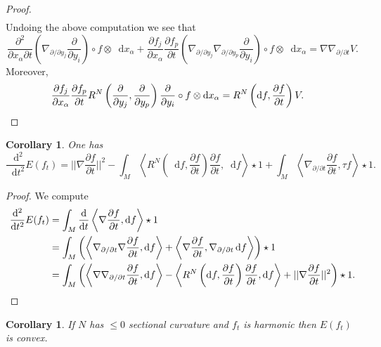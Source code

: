 \documentclass[reqno,12pt,letterpaper]{amsart}
\newcommand*\dif{\mathop{}\!\mathrm{d}}
\newcommand{\parl}{\left(}
\newcommand{\parr}{\right)}
\newcommand{\bral}{\left\langle}
\newcommand{\brar}{\right\rangle}
\newtheorem{corollary}[theorem]{Corollary}
\theoremstyle{definition}
\numberwithin{equation}{section}
\begin{document}
\begin{proof}
\begin{align*}
\end{align*}
Undoing the above computation we see that 
$$\frac{\partial^2}{\partial x_\alpha \partial t} \parl \nabla_{\partial/\partial y_j} \frac{\partial}{\partial y_i} \parr \circ f \otimes \dif x_\alpha + \frac{\partial f_j}{\partial x_\alpha} \frac{\partial f_p}{\partial t} \parl \nabla_{\partial/\partial y_j} \nabla_{\partial/\partial y_p} \frac{\partial}{\partial y_i} \parr \circ f \otimes \dif x_\alpha = \nabla \nabla_{\partial/\partial t} V.$$
Moreover,
\begin{align*}
\frac{\partial f_j}{\partial x_\alpha} \frac{\partial f_p}{\partial t} R^N \parl \frac{\partial}{\partial y_j}, \frac{\partial}{\partial y_p} \parr \frac{\partial}{\partial y_i} \circ f \otimes \dif x_\alpha &= R^N \parl \dif f, \frac{\partial f}{\partial t} \parr V. \qedhere
\end{align*}
\end{proof}

\begin{corollary}
One has 
$$\frac{\dif^2}{\dif t^2} E(f_t) = ||\nabla \frac{\partial f}{\partial t}||^2 - \int_M \bral R^N \parl \dif f, \frac{\partial f}{\partial t} \parr \frac{\partial f}{\partial t}, \dif f \brar \star 1 + \int_M \bral \nabla_{\partial/\partial t} \frac{\partial f}{\partial t}, \tau f \brar \star 1.$$
\end{corollary}
\begin{proof}
We compute 
\begin{align*}
\frac{\dif^2}{\dif t^2} E(f_t) &= \int_M \frac{\dif}{\dif t} \bral \nabla \frac{\partial f}{\partial t}, \dif f \brar \star 1 \\
&= \int_M \parl \bral \nabla_{\partial/\partial t} \nabla \frac{\partial f}{\partial t}, \dif f \brar + \bral \nabla \frac{\partial f}{\partial t}, \nabla_{\partial/\partial t} \dif f \brar \parr \star 1 \\
&= \int_M \parl \bral \nabla \nabla_{\partial/\partial t} \frac{\partial f}{\partial t}, \dif f \brar - \bral R^N \parl \dif f, \frac{\partial f}{\partial t} \parr \frac{\partial f}{\partial t}, \dif f \brar + ||\nabla \frac{\partial f}{\partial t}||^2 \parr \star 1. \qedhere
\end{align*}
\end{proof}

\begin{corollary}
If $N$ has $\leq 0$ sectional curvature and $f_t$ is harmonic then $E(f_t)$ is convex.
\end{corollary}
\end{document}
